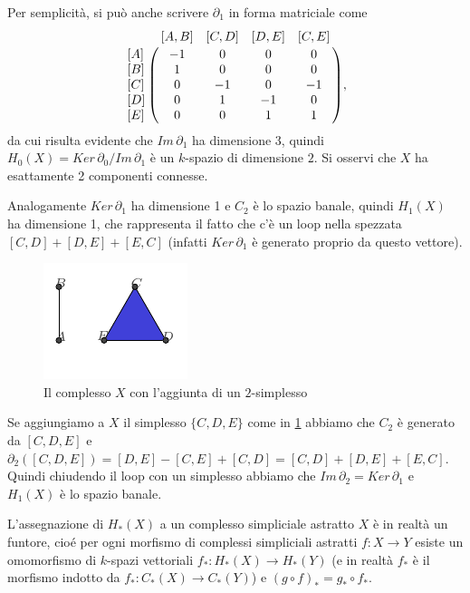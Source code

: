 Per semplicità, si può anche scrivere $\partial_1$ in forma matriciale come
\begin{equation*}
  \bordermatrix{
     & [A,B] & [C,D] & [D,E] & [C,E]\cr
    [A] & -1 & 0 & 0 & 0 \cr
    [B] & 1 & 0 & 0 & 0 \cr
    [C] & 0 & -1 & 0 & -1 \cr
    [D] & 0 & 1 & -1 & 0\cr
    [E] & 0 & 0 & 1 & 1\cr
  },
\end{equation*}
da cui risulta evidente che $Im\,\partial_1$ ha dimensione 3, quindi $H_0(X) = Ker\,\partial_0 / Im\,\partial_1$ è un $k$-spazio di dimensione $2$. Si osservi che $X$ ha esattamente 2 componenti connesse.

Analogamente $Ker\,\partial_1$ ha dimensione 1 e $C_2$ è lo spazio banale, quindi $H_1(X)$ ha dimensione 1, che rappresenta il fatto che c'è un loop nella spezzata $[C,D] + [D,E] + [E,C]$ (infatti $Ker\,\partial_1$ è generato proprio da questo vettore).

\begin{figure}[h]
  \includegraphics[width=.7\linewidth]{gfx/example_homology_loop.pdf}
  \caption{Il complesso $X$ con l'aggiunta di un $2$-simplesso}
  \label{fig:simplicialcomplexloop}
\end{figure}

Se aggiungiamo a $X$ il simplesso $\{C,D,E\}$ come in \cref{fig:simplicialcomplexloop} abbiamo che $C_2$ è generato da $[C,D,E]$ e $\partial_2([C,D,E]) = [D,E] - [C,E] + [C,D] = [C,D] + [D,E] + [E,C]$. Quindi chiudendo il loop con un simplesso abbiamo che
$Im\,\partial_2 = Ker\,\partial_1$ e $H_1(X)$ è lo spazio banale.

\begin{rmk}
  L'assegnazione di $H_*(X)$ a un complesso simpliciale astratto $X$ è in realtà un funtore, cioé per ogni morfismo di complessi simpliciali astratti $f:X\to Y$ esiste un omomorfismo di $k$-spazi vettoriali $f_*:H_*(X)\to H_*(Y)$ (e in realtà $f_*$ è il morfismo indotto da $f_*:C_*(X)\to C_*(Y)$) e $(g\circ f)_* = g_* \circ f_*$.
\end{rmk}


